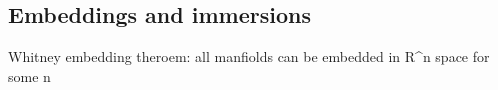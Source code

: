 
\subsection{Embeddings and immersions}
Whitney embedding theroem: all manfiolds can be embedded in R^n space for some n


